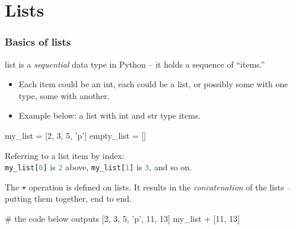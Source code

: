 \documentclass{beamer}
\newenvironment{codeblock}
    {\hfill\begin{beamerboxesrounded}[lower=codecol, width=0.8\textwidth]
    \medskip

    }
    { 
    \end{beamerboxesrounded}\hfill
    }
\theoremstyle{example}
\newcommand{\ct}[1]{\lstinline[language=Python]!#1!}
\newcommand{\ttt}[1]{\texttt{#1}}
\newcommand{\lsitem}[2]{\ttt{{#1}[}\ct{#2}\ttt{]}}
\begin{document}
\section{Lists}

\begin{frame}[fragile]
\frametitle{Basics of lists}

{\ttb list} is a \emph{sequential} data type in Python {--} it holds a sequence of ``items.'' 
\begin{itemize}
	\item[] Each item could be an {\ttb int}, each could be a {\ttb list}, or possibly some with one type, some with another. 
	\pause
	\item[] Example below: a list with {\ttb int} and {\ttb str} type items.
\end{itemize}

\begin{codeblock}

\begin{python}
my_list = [2, 3, 5, 'p']
empty_list = []
\end{python}

\end{codeblock}

\pause
Referring to a list item by index: \\ 
\ttt{my}\ct{_}\lsitem{list}{0} is \ct{2} above, \ttt{my}\ct{_}\lsitem{list}{1} is \ct{3}, and so on.

\pause
The \ttt{+} operation is defined on lists. It results in the \emph{concatenation} of the lists {--} putting them together, end to end.

\begin{codeblock}

\begin{python}
# the code below outputs [2, 3, 5, 'p', 11, 13]
my_list + [11, 13]
\end{python}

\end{codeblock}

\end{frame}
\end{document}
